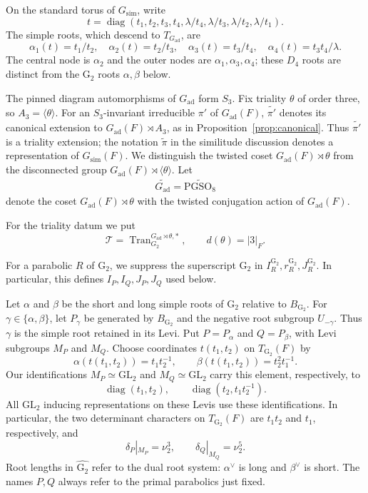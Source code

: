 \documentclass[12pt]{amsart}
\theoremstyle{definition}
\theoremstyle{plain}
\theoremstyle{remark}
\def\GL{\mathrm{GL}}
\def\PGSO{\mathrm{PGSO}}
\DeclareMathOperator{\diag}{diag} %
\numberwithin{equation}{section}
\newcommand{\rG}{\mathrm{G}}
\begin{document}
On the standard torus of $G_{\mathrm{sim}}$, write
\[
 t=\diag(t_1,t_2,t_3,t_4,\lambda/t_4,\lambda/t_3,\lambda/t_2,\lambda/t_1).
\]
The simple roots, which descend to $T_{G_{\mathrm{ad}}}$, are
\[
 \alpha_1(t)=t_1/t_2,\quad \alpha_2(t)=t_2/t_3,\quad
 \alpha_3(t)=t_3/t_4,\quad \alpha_4(t)=t_3t_4/\lambda.
\]
The central node is $\alpha_2$ and the outer nodes are
$\alpha_1,\alpha_3,\alpha_4$; these $D_4$ roots are distinct from
the $\rG_2$ roots $\alpha,\beta$ below.



The pinned diagram automorphisms of $G_{\mathrm{ad}}$ form $S_3$.
Fix triality $\theta$ of order three, so $A_3=\langle\theta\rangle$.
For an $S_3$-invariant irreducible $\pi'$ of $G_{\mathrm{ad}}(F)$,
$\widetilde{\pi'}$ denotes its canonical extension to
$G_{\mathrm{ad}}(F)\rtimes A_3$, as in Proposition~\ref{prop:canonical}.
Thus $\widetilde{\pi'}$ is a triality extension; the notation
$\widetilde\pi$ in the similitude discussion denotes a representation
of $G_{\mathrm{sim}}(F)$. We distinguish the twisted coset $G_{\mathrm{ad}}(F) \rtimes \theta$
from the disconnected group $G_{\mathrm{ad}}(F)\rtimes\langle\theta\rangle$.
Let 
\begin{align*}
      \widetilde{G_{\mathrm{ad}}} = \widetilde{\PGSO_8}
\end{align*}
denote the coset $G_{\mathrm{ad}}(F) \rtimes \theta$ with the twisted conjugation action of $G_{\mathrm{ad}}(F)$.

For the triality datum we put
\[
 \mathcal T=\operatorname{Tran}_{G_2}^{G_{\mathrm{ad}} \rtimes \theta, *},
 \qquad d(\theta)=|3|_F.
\]

For a parabolic $R$ of ${\rG_2}$, we suppress the superscript ${\rG_2}$
in $I_R^{\rG_2},r_R^{\rG_2},J_R^{\rG_2}$. In particular, this defines
$I_P,I_Q,J_P,J_Q$ used below.

Let $\alpha$ and $\beta$ be the short and long simple roots
of ${\rG_2}$ relative to $B_{\rG_2}$. For $\gamma\in\{\alpha,\beta\}$,
let $P_\gamma$ be generated by $B_{\rG_2}$ and the negative root
subgroup $U_{-\gamma}$. Thus $\gamma$ is the simple root
retained in its Levi. Put $P=P_\alpha$ and $Q=P_\beta$,
with Levi subgroups $M_P$ and $M_Q$.
Choose coordinates $t(t_1,t_2)$ on $T_{\rG_2}(F)$ by
\[
 \alpha(t(t_1,t_2))=t_1t_2^{-1},
 \qquad
 \beta(t(t_1,t_2))=t_2^2t_1^{-1}.
\]
Our identifications $M_P\simeq\GL_2$ and $M_Q\simeq\GL_2$
carry this element, respectively, to
\[
 \diag(t_1,t_2),\qquad
 \diag(t_2,t_1t_2^{-1}).
\]
All $\GL_2$ inducing representations on these Levis use these
identifications. In particular, the two determinant characters
on $T_{\rG_2}(F)$ are $t_1t_2$ and $t_1$, respectively, and
\[
 \delta_P|_{M_P}=\nu_2^3,\qquad
 \delta_Q|_{M_Q}=\nu_2^5.
\]
Root lengths in $\widehat{\rG_2}$ refer to the dual root system:
$\alpha^\vee$ is long and $\beta^\vee$ is short.
The names $P,Q$ always refer to the primal parabolics just fixed.
\end{document}
